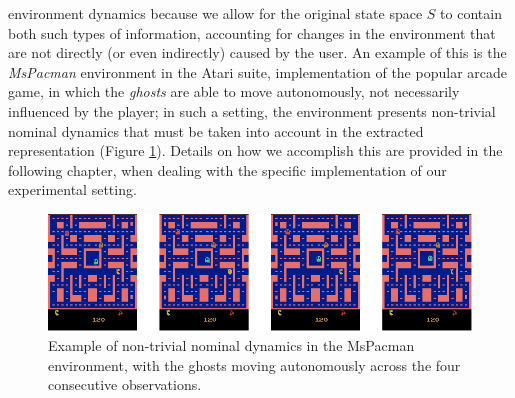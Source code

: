 environment dynamics because we allow for the original state space $S$ to 
contain both such types of information, accounting for changes in the 
environment that are not directly (or even indirectly) caused by the user. 
An example of this is the \textit{MsPacman} environment in the Atari suite, 
implementation of the popular arcade game, in which the \textit{ghosts} are able
to move autonomously, not necessarily influenced by the player; in such a 
setting, the environment presents non-trivial nominal dynamics that must be 
taken into account in the extracted representation (Figure \ref{f:nominal_dyn}).
Details on how we accomplish this are provided in the following chapter, when 
dealing with the specific implementation of our experimental setting.
%
\begin{figure}
\includegraphics[width=\textwidth]{pictures/nominal_dyn}
\centering
\caption[Example of non-trivial nominal dynamics]{Example of non-trivial nominal
						  dynamics in the \textup{MsPacman}
						  environment, with the ghosts 
						  moving autonomously across the
						  four consecutive observations.}
\label{f:nominal_dyn}
\end{figure}
%


